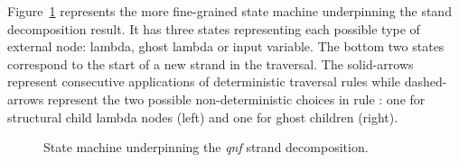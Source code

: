 \documentclass{elsarticle}
\theoremstyle{plain}
\theoremstyle{definition}
\theoremstyle{remark}
\newcommand{\ghostlmd}{{\lambda\!\!\lambda}}
\begin{document}
Figure~\ref{fig:qnf_strand_decomposition_statemachine} represents the more fine-grained state machine underpinning the stand decomposition result. It has three states representing each possible type of external node: lambda, ghost lambda or input variable. The bottom two states correspond to the start of a new strand in the traversal. The solid-arrows represent consecutive applications of deterministic traversal rules while dashed-arrows represent the two possible non-deterministic choices in rule : one for structural child lambda nodes (left) and one for ghost children (right).
\begin{figure}[htbp]
\centering
{}
\caption{State machine underpinning the \emph{qnf} strand decomposition.}
\label{fig:qnf_strand_decomposition_statemachine}
\end{figure}
\end{document}
